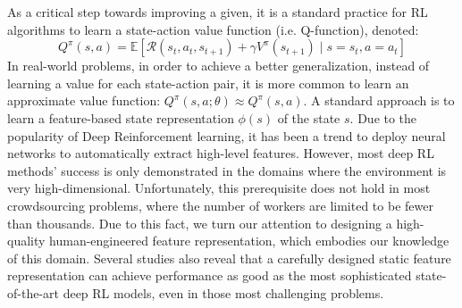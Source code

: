 As a critical step towards improving a given, it is a standard practice for RL algorithms to learn a state-action value function (i.e. Q-function), denoted:
$$
Q^\pi(s,a) = \mathbb{E}\left[ \mathcal{R}(s_t,a_t,s_{t+1}) + \gamma V^\pi(s_{t+1}) \mid s = s_t, a = a_t \right]
$$
In real-world problems, in order to achieve a better generalization, instead of learning a value for each state-action pair, it is more common to learn an approximate value function: $Q^\pi(s,a; \theta) \approx Q^\pi(s,a)$. A standard approach is to learn a feature-based state representation $\phi(s)$ of the state $s$. Due to the popularity of Deep Reinforcement learning, it has been a trend to deploy neural networks to automatically extract high-level features\cite{}. 
However, most deep RL methods' success is only demonstrated in the domains where the environment is very high-dimensional\cite{}. Unfortunately, this prerequisite does not hold in most crowdsourcing problems, where the number of workers are limited to be fewer than thousands. Due to this fact, we turn our attention to designing a high-quality human-engineered feature representation, which embodies our knowledge of this domain. Several studies also reveal that a carefully designed static feature representation can achieve performance as good as the most sophisticated state-of-the-art deep RL models, even in those most challenging problems. \cite{}

